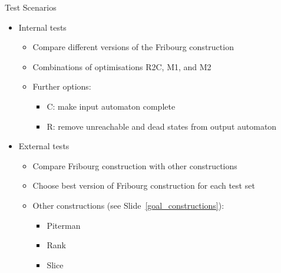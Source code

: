 \documentclass[12pt]{beamer}
\begin{document}
\begin{frame}{Test Scenarios}
\begin{itemize}\itemsep5pt
\item Internal tests 
  \begin{itemize}\itemsep3pt
  \item Compare different versions of the Fribourg construction
  \item Combinations of optimisations R2C, M1, and M2
  \item Further options:
    \begin{itemize} \itemsep1pt
    \item C: make input automaton complete
    \item R: remove unreachable and dead states from output automaton
    \end{itemize}
  \end{itemize}
\pause
\item External tests
  \begin{itemize}\itemsep3pt
  \item Compare Fribourg construction with other constructions
  \item Choose best version of Fribourg construction for each test set
  \item Other constructions (see Slide~\ref{goal_constructions}):
    \begin{itemize} \itemsep1pt
    \item Piterman \tabto{1.5cm} \cite{2006_piterman,2007_piterman}
    \item Rank     \tabto{1.5cm} \cite{schewe2009buchi}
    \item Slice    \tabto{1.5cm} \cite{vardi2007automata}
    \end{itemize}
  \end{itemize}
\end{itemize}
\end{frame}
\end{document}
